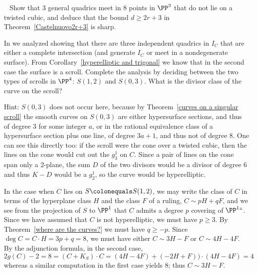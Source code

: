 \begin{exercise}~\label{2r+3 is sharp}
Show that 3 general quadrics meet in 8 points in $\PP^3$ that do not
lie on a twisted cubic, and deduce that the bound $d \geq 2r+3$ in
Theorem~\ref{Castelnuovo2r+3}
is sharp.
\end{exercise}

\begin{exercise}
\label{extrigonal genus 5}
In
we analyzed 
%
showing that
there are three independent quadrics in $I_C$ that are either a complete
intersection (and generate $I_C$ or
meet in a nondegenerate surface). From Corollary~\ref{hyperelliptic and
trigonal} we know that in the second case
the surface is a scroll. Complete the analysis by deciding between the
two types of scrolls in $\PP^4$: $S(1,2)$ and $S(0,3)$.
What is the divisor class of the curve on the scroll?

Hint: $S(0,3)$ does not occur here, because by Theorem~\ref{curves on a
singular scroll} the smooth curves on $S(0,3)$ are either hypersurface
sections, and thus of degree $3$ for
some integer $a$, or in the rational equivalence class of a hypersurface
section plus one line,
of degree $3a+1$, and thus not of degree 8. One can see this directly too:
if the scroll were the cone over
a twisted cubic, then the lines on the cone would cut out the $g^1_3$
on $C$. Since a pair of lines on the cone span
only a 2-plane, the sum $D$ of the two divisors would be a divisor of
degree 6  and thus $K-D$ would be a $g^1_2$,
so the curve would be hyperelliptic.

In the case when $C$ lies on $S \colonequals  S(1,2)$, we may write
the class of $C$ in terms of the hyperplane class $H$ and the class $F$
of a ruling, $C\sim pH+qF$, and we see from the
projection of $S$ to $\PP^1$ that $C$ admits
a degree $p$ covering of $\PP^1` `$. Since we have assumed that $C$
is not hyperelliptic,
we must have $p\geq 3$. By Theorem~\ref{where are the curves?} we
must have
$q\geq -p$. Since $\deg C = C\cdot H = 3p+q = 8$, we must have either
$C\sim 3H-F$ or $C\sim 4H-4F$. By the adjunction formula, in the second
case,
$$
2g(C)-2 = 8 = (C+K_S)\cdot C = (4H-4F)+(-2H+F))\cdot(4H-4F) =4
$$
whereas a similar computation in the first case yields 8; thus $C\sim
3H-F$.


\end{exercise}
